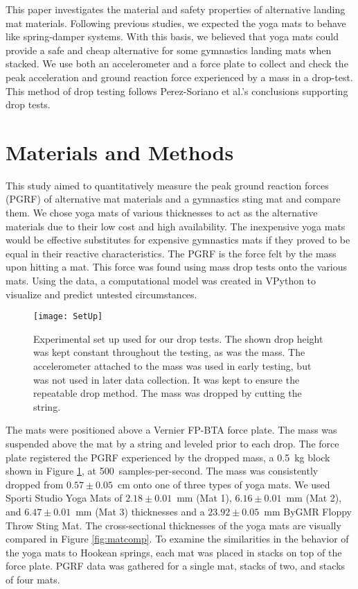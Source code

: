 \documentclass[12pt,aps,prb,preprint]{revtex4-1}   %
\begin{document}
This paper investigates the material and safety properties of alternative landing mat materials. Following previous studies, we expected the yoga mats to behave like spring-damper systems. With this basis, we believed that yoga mats could provide a safe and cheap alternative for some gymnastics landing mats when stacked. We use both an accelerometer and a force plate to collect and check the peak acceleration and ground reaction force experienced by a mass in a drop-test. This method of drop testing follows Perez-Soriano et al.’s conclusions supporting drop tests\cite{Perez}.

\section{Materials and Methods}

This study aimed to quantitatively measure the peak ground reaction forces (PGRF) of alternative mat materials and a gymnastics sting mat and compare them. We chose yoga mats of various thicknesses to act as the alternative materials due to their low cost and high availability. The inexpensive yoga mats would be effective substitutes for expensive gymnastics mats if they proved to be equal in their reactive characteristics. The PGRF is the force felt by the mass upon hitting a mat. This force was found using mass drop tests onto the various mats. Using the data, a computational model was created in VPython to visualize and predict untested circumstances.

\begin{figure}[h]
	\centering
	\texttt{[image: SetUp]}
	\caption{Experimental set up used for our drop tests. The shown drop height was kept constant throughout the testing, as was the mass. The accelerometer attached to the mass was used in early testing, but was not used in later data collection. It was kept to ensure the repeatable drop method. The mass was dropped by cutting the string.}
	\label{fig:setup}
\end{figure}

The mats were positioned above a Vernier FP-BTA force plate. The mass was suspended above the mat by a string and leveled prior to each drop. The force plate registered the PGRF experienced by the dropped mass, a 0.5~kg block shown in Figure \ref{fig:setup}, at 500~samples-per-second. The mass was consistently dropped from $0.57 \pm 0.05$~cm onto one of three types of yoga mats. We used Sporti Studio Yoga Mats of $2.18 \pm 0.01$~mm (Mat 1), $6.16 \pm 0.01$~mm (Mat 2), and $6.47 \pm 0.01$~mm (Mat 3) thicknesses and a $23.92 \pm 0.05$~mm ByGMR Floppy Throw Sting Mat. The cross-sectional thicknesses of the yoga mats are visually compared in Figure \ref{fig:matcomp}. To examine the similarities in the behavior of the yoga mats to Hookean springs, each mat was placed in stacks on top of the force plate. PGRF data was gathered for a single mat, stacks of two, and stacks of four mats.
\end{document}
